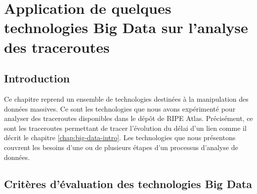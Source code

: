 \chapter{Application de quelques technologies Big Data sur l'analyse des traceroutes} \label{chap:application-on-traceroutes}


\section{Introduction}

Ce chapitre reprend un ensemble de   technologies destinées  à la manipulation des données massives. Ce sont les technologies que nous avons expérimenté pour analyser des traceroutes disponibles dans le dépôt de RIPE Atlas. Précisément, ce sont les traceroutes permettant de tracer l'évolution du délai d'un lien comme il décrit le chapitre \ref{chap:big-data-intro}.
Les technologies que nous présentons  couvrent les besoins d'une ou de plusieurs étapes d'un processus d'analyse de données.
 

\section{Critères d'évaluation des technologies  Big Data}

